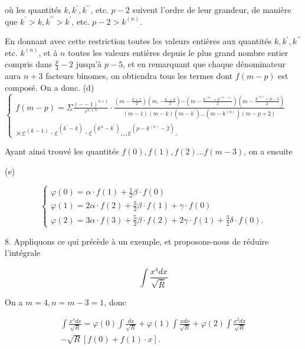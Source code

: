 \documentclass{article}
\begin{document}
où les quantités \(k, k^{\prime}, k^{\prime \prime}\), etc. \(p-2\) suivent l'ordre de leur grandeur, de manière que \(k^{\prime}>k, k^{\prime \prime}>k^{\prime}\), etc. \(p-2>k^{(n)}\).

En donnant avec cette restriction toutes les valeurs entières aux quantités \(k, k^{\prime}, k^{\prime \prime}\) etc. \(k^{(n)}\), et à \(n\) toutes les valeurs entières depuis le plus grand nombre entier compris dans \(\frac{p}{4}-2\) jusqu'à \(p-5\), et en remarquant que chaque dénominateur aura \(n+3\) facteurs binomes, on obtiendra tous les termes dont \(f(m-p)\) est composé. On a donc.
(d) \(\left\{\begin{array}{c}f(m-p)=\Sigma \frac{(--1)^{n+1}}{\varepsilon^{n+3}} \cdot \frac{\left(m-\frac{k+1}{2}\right)\left(m,-\frac{k^{\prime}+k}{2}\right) \cdots\left(m-\frac{k^{(n)}+k^{(n-1)}}{2}\right)\left(m-\frac{k^{(n)}+p-2}{2}\right)}{(m-1)(m-k)\left(m-k^{\prime}\right) \ldots\left(m-k^{(n)}\right)(m-p+2)} \\ \times \varepsilon^{(k-1)} \cdot \varepsilon^{\left(k^{\prime}-k\right)} \cdot \varepsilon^{\left(k^{n}-k^{\prime}\right)} \ldots \varepsilon^{\left(p-k^{(n)}-2\right)} .\end{array}\right.\)

Ayant ainsi trouvé les quantités \(f(0), f(1), f(2) \ldots f(m-3)\), on a ensuite

(e)

\[
\left\{\begin{array}{l}
\varphi(0)=\alpha \cdot f(1)+\frac{1}{2} \beta \cdot f(0) \\
\varphi(1)=2 \alpha \cdot f(2)+\frac{3}{2} \beta \cdot f(1)+\gamma \cdot f(0) \\
\varphi(2)=3 \alpha \cdot f(3)+\frac{5}{2} \beta \cdot f(2)+2 \gamma \cdot f(1)+\frac{3}{2} \delta \cdot f(0) .
\end{array}\right.
\]

8. Appliquons ce qui précède à un exemple, et proposons-nous de réduire l'intégrale

\[
\int \frac{x^{4} d x}{\sqrt{\bar{R}}}
\]

On a \(m=4, n=m-3=1\), donc

\[
\begin{gathered}
\int \frac{x^{4} d x}{\sqrt{R}}=\varphi(0) \int \frac{d x}{\sqrt{R}}+\varphi(1) \int \frac{x d x}{\sqrt{R}}+\varphi(2) \int \frac{x^{2} d x}{\sqrt{R}} \\
-\sqrt{R}[f(0)+f(1) \cdot x] .
\end{gathered}
\]
\end{document}

